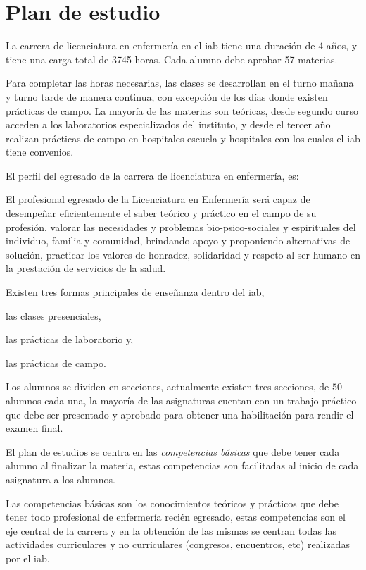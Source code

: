 \section{Plan de estudio}
\label{sec:plan_estudio}

La carrera de licenciatura en enfermería en el \Gls{iab} tiene una duración de 4
años,  y tiene una carga total de 3745
horas. Cada alumno debe aprobar 57 materias.

Para completar las horas necesarias, las clases se desarrollan en el turno
mañana y turno tarde de manera continua, con excepción de los días donde existen
prácticas de campo. La mayoría de las materias son teóricas, desde segundo curso
acceden a los laboratorios especializados del instituto, y desde el tercer año
realizan prácticas de campo en hospitales escuela y hospitales con los cuales el
\Gls{iab} tiene convenios.

El perfil del egresado de la carrera de licenciatura en enfermería,
es\cite{iab:enfermeria}:

\begin{displayquote}

El profesional egresado de la Licenciatura en Enfermería será capaz de
desempeñar eficientemente el saber teórico y práctico en el campo de su
profesión, valorar las necesidades y problemas bio-psico-sociales y espirituales
del individuo, familia y comunidad, brindando apoyo y proponiendo alternativas
de solución, practicar los valores de honradez, solidaridad y respeto al ser
humano en la prestación de servicios de la salud.

\end{displayquote}

Existen tres formas principales de enseñanza dentro del \Gls{iab}, 
\begin{enumerate*}[label=\itshape\alph*\upshape.]
\item las clases presenciales, 
\item las prácticas de laboratorio y, 
\item las prácticas de campo.
\end{enumerate*}


Los alumnos se dividen en secciones, actualmente existen tres secciones, de $50$
alumnos cada una, la mayoría de las asignaturas cuentan con un trabajo práctico
que debe ser presentado y aprobado para obtener una habilitación para rendir el
examen final.

El plan de estudios se centra en las \emph{competencias básicas} que debe tener
cada alumno al finalizar la materia, estas competencias son facilitadas al
inicio de cada asignatura a los alumnos.

Las competencias básicas son los conocimientos teóricos y prácticos que debe
tener todo profesional de enfermería recién egresado, estas competencias son el
eje central de la carrera y en la obtención de las mismas se centran todas las
actividades curriculares y no curriculares (congresos, encuentros, etc)
realizadas por el \Gls{iab}.
